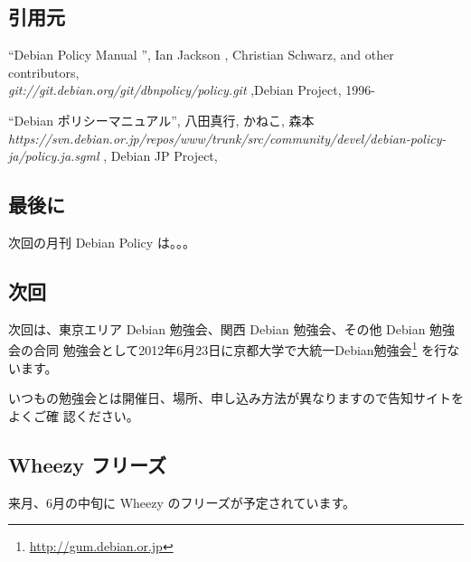\documentclass[mingoth,a4paper]{jsarticle}
\begin{document}
\subsection{引用元}

\begin{list}{}{\setlength{\itemindent}{-2em}\setlength{\itemsep}{1ex plus 1ex}}
\item ``Debian Policy Manual '', Ian Jackson ,  Christian Schwarz, and other contributors,\hfill \\  {\it git://git.debian.org/git/dbnpolicy/policy.git} ,Debian Project, 1996-

\item ``Debian ポリシーマニュアル'', 八田真行, かねこ, 森本\hfill \\ {\it https://svn.debian.or.jp/repos/www/trunk/src/community/devel/debian-policy-ja/policy.ja.sgml} , Debian JP Project, 
\end{list}

\subsection{最後に}
次回の月刊 Debian Policy は。。。

\clearpage


\subsection{次回}

次回は、東京エリア Debian 勉強会、関西 Debian 勉強会、その他 Debian 勉強会の合同
勉強会として2012年6月23日に京都大学で大統一Debian勉強会\footnote{\url{http://gum.debian.or.jp}}
を行ないます。

いつもの勉強会とは開催日、場所、申し込み方法が異なりますので告知サイトをよくご確
認ください。

\subsection{Wheezy フリーズ}
来月、6月の中旬に Wheezy のフリーズが予定されています。



\printindex
 \cleartooddpage
\end{document}
